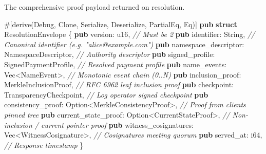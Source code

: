 \documentclass[
]{article}
\newenvironment{Shaded}{}{}
\newcommand{\AttributeTok}[1]{\textcolor[rgb]{0.49,0.56,0.16}{#1}}
\newcommand{\BuiltInTok}[1]{\textcolor[rgb]{0.00,0.50,0.00}{#1}}
\newcommand{\CommentTok}[1]{\textcolor[rgb]{0.38,0.63,0.69}{\textit{#1}}}
\newcommand{\DataTypeTok}[1]{\textcolor[rgb]{0.56,0.13,0.00}{#1}}
\newcommand{\KeywordTok}[1]{\textcolor[rgb]{0.00,0.44,0.13}{\textbf{#1}}}
\newcommand{\NormalTok}[1]{#1}
\newcommand{\OperatorTok}[1]{\textcolor[rgb]{0.40,0.40,0.40}{#1}}
\begin{document}
The comprehensive proof payload returned on resolution.

\begin{Shaded}
\begin{Highlighting}[]
\AttributeTok{\#[}\NormalTok{derive}\AttributeTok{(}\BuiltInTok{Debug}\OperatorTok{,} \BuiltInTok{Clone}\OperatorTok{,}\NormalTok{ Serialize}\OperatorTok{,}\NormalTok{ Deserialize}\OperatorTok{,} \BuiltInTok{PartialEq}\OperatorTok{,} \BuiltInTok{Eq}\AttributeTok{)]}
\KeywordTok{pub} \KeywordTok{struct}\NormalTok{ ResolutionEnvelope }\OperatorTok{\{}
    \KeywordTok{pub}\NormalTok{ version}\OperatorTok{:} \DataTypeTok{u16}\OperatorTok{,}                                \CommentTok{// Must be 2}
    \KeywordTok{pub}\NormalTok{ identifier}\OperatorTok{:} \DataTypeTok{String}\OperatorTok{,}                          \CommentTok{// Canonical identifier (e.g. "alice@example.com")}
    \KeywordTok{pub}\NormalTok{ namespace\_descriptor}\OperatorTok{:}\NormalTok{ NamespaceDescriptor}\OperatorTok{,}   \CommentTok{// Authority descriptor}
    \KeywordTok{pub}\NormalTok{ signed\_profile}\OperatorTok{:}\NormalTok{ SignedPaymentProfile}\OperatorTok{,}        \CommentTok{// Resolved payment profile}
    \KeywordTok{pub}\NormalTok{ name\_events}\OperatorTok{:} \DataTypeTok{Vec}\OperatorTok{\textless{}}\NormalTok{NameEvent}\OperatorTok{\textgreater{},}                 \CommentTok{// Monotonic event chain (0..N)}
    \KeywordTok{pub}\NormalTok{ inclusion\_proof}\OperatorTok{:}\NormalTok{ MerkleInclusionProof}\OperatorTok{,}       \CommentTok{// RFC 6962 leaf inclusion proof}
    \KeywordTok{pub}\NormalTok{ checkpoint}\OperatorTok{:}\NormalTok{ TransparencyCheckpoint}\OperatorTok{,}          \CommentTok{// Log operator signed checkpoint}
    \KeywordTok{pub}\NormalTok{ consistency\_proof}\OperatorTok{:} \DataTypeTok{Option}\OperatorTok{\textless{}}\NormalTok{MerkleConsistencyProof}\OperatorTok{\textgreater{},} \CommentTok{// Proof from client\textquotesingle{}s pinned tree}
    \KeywordTok{pub}\NormalTok{ current\_state\_proof}\OperatorTok{:} \DataTypeTok{Option}\OperatorTok{\textless{}}\NormalTok{CurrentStateProof}\OperatorTok{\textgreater{},} \CommentTok{// Non{-}inclusion / current pointer proof}
    \KeywordTok{pub}\NormalTok{ witness\_cosignatures}\OperatorTok{:} \DataTypeTok{Vec}\OperatorTok{\textless{}}\NormalTok{WitnessCosignature}\OperatorTok{\textgreater{},}  \CommentTok{// Cosignatures meeting quorum}
    \KeywordTok{pub}\NormalTok{ served\_at}\OperatorTok{:} \DataTypeTok{i64}\OperatorTok{,}                              \CommentTok{// Response timestamp}
\OperatorTok{\}}
\end{Highlighting}
\end{Shaded}
\end{document}
